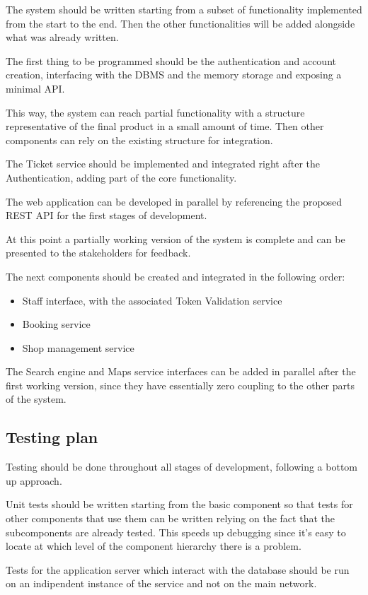 The system should be written starting from a subset of functionality implemented from the start to the end. Then the other functionalities will be added alongside what was already written.

The first thing to be programmed should be the authentication and account creation, interfacing with the DBMS and the memory storage and exposing a minimal API.

This way, the system can reach partial functionality with a structure representative of the final product in a small amount of time. Then other components can rely on the existing structure for integration.

The Ticket service should be implemented and integrated right after the Authentication, adding part of the core functionality.

The web application can be developed in parallel by referencing the proposed REST API for the first stages of development.

At this point a partially working version of the system is complete and can be presented to the stakeholders for feedback.

The next components should be created and integrated in the following order:
\begin{itemize}\tightlist
    \item Staff interface, with the associated Token Validation service
    \item Booking service
    \item Shop management service
\end{itemize}

The Search engine and Maps service  interfaces can be added in parallel after the first working version, since they have essentially zero coupling to the other parts of the system.

\subsection{Testing plan}

Testing should be done throughout all stages of development, following a bottom up approach.

Unit tests should be written starting from the basic component so that tests for other components that use them can be written relying on the fact that the subcomponents are already tested. This speeds up debugging since it's easy to locate at which level of the component hierarchy there is a problem.

Tests for the application server which interact with the database should be run on an indipendent instance of the service and not on the main network.

